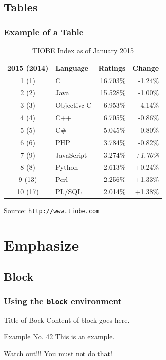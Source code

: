 \documentclass[english]{beamer}
\begin{document}
\subsection{Tables}

\begin{frame}
 \frametitle{Example of a Table}
\begin{table}[ht]
 \begin{tabular}{clrr} \toprule
 2015 (2014)	& 	Language 	& Ratings 	& Change \\
 \midrule
1	(1)		& C		& 16.703\%	& -1.24\% \\
2	   (2)		& Java	& 15.528\%	& -1.00\% \\
3	   (3)		& Objective-C	& 6.953\%	& -4.14\% \\
4	   (4)		& C++	& 6.705\%	& -0.86\% \\
5	   (5)		& C\#		& 5.045\%	& -0.80\% \\
6	   (6)		& PHP	& 3.784\%	& -0.82\% \\
7	   (9)		& JavaScript	& 3.274\%	& \emph{+1.70\%} \\
8	   (8)		& Python	& 2.613\%	& +0.24\% \\
9	 (13)		& Perl	& 2.256\%	& +1.33\% \\
10	 (17)		& PL/SQL	& 2.014\%	& +1.38\% \\
\bottomrule
 \end{tabular}
 \caption{TIOBE Index as of January 2015}
\end{table}
\vspace{-3mm}
\tiny Source: \texttt{http://www.tiobe.com}
\end{frame}



\section{Emphasize}

\subsection{Block}

\begin{frame}
 \frametitle{Using the \texttt{block} environment}
\begin{block}{Title of Bock}
  Content of block goes here.
\end{block}

\begin{exampleblock}{Example No. 42}
  This is an example.
\end{exampleblock}
 
\begin{alertblock}{Watch out!!!}
  You must not do that!
\end{alertblock}
\end{frame}
\end{document}
